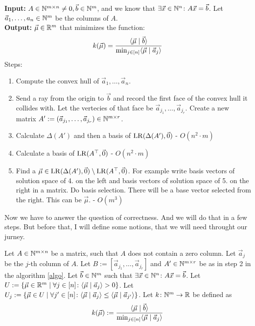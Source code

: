 \begin{algorithm}
    \label{algo}
    \textbf{Input: } $A\in\mathbb{N}^{m\times n} \neq 0, \vec b \in \mathbb{N}^m$, and we know that $\exists \vec x \in \mathbb{N}^n\colon A\vec x = \vec b$. Let $\vec a_1, \dots, a_n\in\mathbb{N}^m$ be the columns of $A$.\\
    \textbf{Output: } $\vec\mu\in\mathbb{R}^m$ that minimizes the function:
    $$k(\vec\mu) = \frac{\langle \vec\mu \mid \vec b \rangle}{\min_{j\in[n]}\langle \vec\mu \mid \vec a_j \rangle}$$
    Steps:
    \begin{enumerate}
        \item Compute the convex hull of $\vec a_1, \dots, \vec a_n$.
        \item Send a ray from the origin to $\vec b$ and record the first face of the convex hull it collides with. Let the vertecies of that face be $\vec a_{j_1}, \dots, \vec a_{j_r}$. Create a new matrix $A' := (\vec a_{j_1}, \dots, \vec a_{j_r}) \in \mathbb{N}^{m \times r}$.
        \item Calculate $\Delta(A')$ and then a basis of $\operatorname{LR}(\Delta(A'), \vec0)$ - $O(n^2 \cdot m)$
        \item Calculate a basis of $\operatorname{LR}(A^\top, \vec0)$ - $O(n^2 \cdot m)$
        \item Find a $\vec\mu \in \operatorname{LR}(\Delta(A'), \vec0) \setminus \operatorname{LR}(A^\top, \vec0)$. For example write basis vectors of solution space of 4. on the left and basis vectors of solution space of 5. on the right in a matrix. Do basis selection. There will be a base vector selected from the right. This can be $\vec\mu$. - $O(m^3)$
    \end{enumerate}
\end{algorithm}
Now we have to answer the question of correctness. And we will do that in a few steps. But before that, I will define some notions, that we will need throught our jurney.
\begin{definition}
    \label{def:algo_basic}
    Let $A \in \mathbb{N}^{m \times n}$ be a matrix, such that $A$ does not contain a zero column. Let $\vec a_j$ be the $j$-th column of $A$. Let $B := [\vec a_{j_1}, \dots, \vec a_{j_r}]$ and $A' \in \mathbb{N}^{m\times r}$ be as in step 2 in the algorithm \ref{algo}. Let $\vec b \in \mathbb{N}^m$ such that $\exists \vec x \in \mathbb{N}^n\colon A\vec x = \vec b$. Let $U := \{\vec\mu \in \mathbb{R}^m\mid \forall j \in [n]\colon\langle \vec\mu \mid \vec a_j \rangle > 0\}$. Let $U_j := \{\vec\mu \in U \mid \forall j'\in[n]\colon \langle \vec\mu \mid \vec a_j \rangle \leq \langle \vec\mu \mid \vec a_{j'} \rangle\}$. Let $k\colon \mathbb{N}^m\to\mathbb{R}$ be defined as 
    $$k(\vec\mu) := \frac{\langle \vec\mu \mid \vec b \rangle}{\min_{j\in[n]}\langle \vec\mu \mid \vec a_j \rangle}$$
\end{definition}

